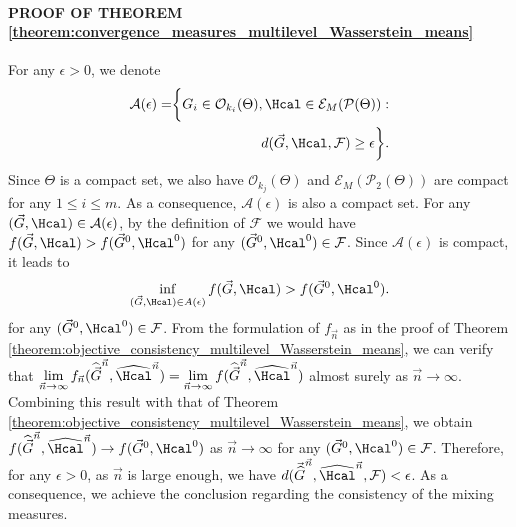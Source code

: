 \paragraph{PROOF OF THEOREM \ref{theorem:convergence_measures_multilevel_Wasserstein_means}} %
For any $\epsilon>0$, we denote
\begin{eqnarray}
\mathcal{A}(\epsilon)=\biggr\{G_{i} \in \mathcal{O}_{k_{i}}(\Theta), \Hcal \in \mathcal{E}_{M}(\mathcal{P}(\Theta)): \nonumber \\
 d(\vec{G},\Hcal,\mathcal{F}) \geq \epsilon\biggr\}. \nonumber
\end{eqnarray}
Since $\Theta$ is a compact set, we also have $\mathcal{O}_{k_{j}}(\Theta)$ and $\mathcal{E}_{M}(\mathcal{P}_{2}(\Theta))$ are compact for any $1 \leq i \leq m$. As a consequence, $\mathcal{A}(\epsilon)$ is also a compact set. For any $(\vec{G},\Hcal) \in \mathcal{A}(\epsilon)$, by the definition of $\mathcal{F}$ we would have $f(\vec{G},\Hcal) > f(\vec{G}^{0},\Hcal^{0})$ for any $(\vec{G}^{0},\Hcal^{0}) \in \mathcal{F}$. Since $\mathcal{A}(\epsilon)$ is compact, it leads to
\begin{eqnarray}
\inf \limits_{(\vec{G},\Hcal) \in A(\epsilon)}{f(\vec{G},\Hcal)} > f(\vec{G}^{0},\Hcal^{0}). \nonumber
\end{eqnarray}
for any $(\vec{G}^{0},\Hcal^{0}) \in \mathcal{F}$. From the formulation of $f_{\vec{n}}$ as in the proof of Theorem \ref{theorem:objective_consistency_multilevel_Wasserstein_means}, %
we can verify that $\lim \limits_{\vec{n} \to \infty} f_{\vec{n}}(\widehat{\vec{G}}^{\vec{n}},\widehat{\Hcal}^{\vec{n}}) = \lim \limits_{\vec{n} \to \infty} f(\widehat{\vec{G}}^{\vec{n}},\widehat{\Hcal}^{\vec{n}})$ almost surely as 
$\vec{n} \to \infty$. Combining this result with that of Theorem \ref{theorem:objective_consistency_multilevel_Wasserstein_means}, %
we obtain $f(\widehat{\vec{G}}^{\vec{n}},\widehat{\Hcal}^{\vec{n}}) \to f(\vec{G}^{0},\Hcal^{0})$ as $\vec{n} \to \infty$ for any $(\vec{G}^{0},\Hcal^{0}) \in \mathcal{F}$. Therefore, for any $\epsilon>0$, as $\vec{n}$ is large enough, we have $d(\vec{\widehat{G}}^{\vec{n}},\widehat{\Hcal}^{\vec{n}},\mathcal{F}) < \epsilon$. As a consequence, we achieve the conclusion regarding the consistency of the mixing measures.
